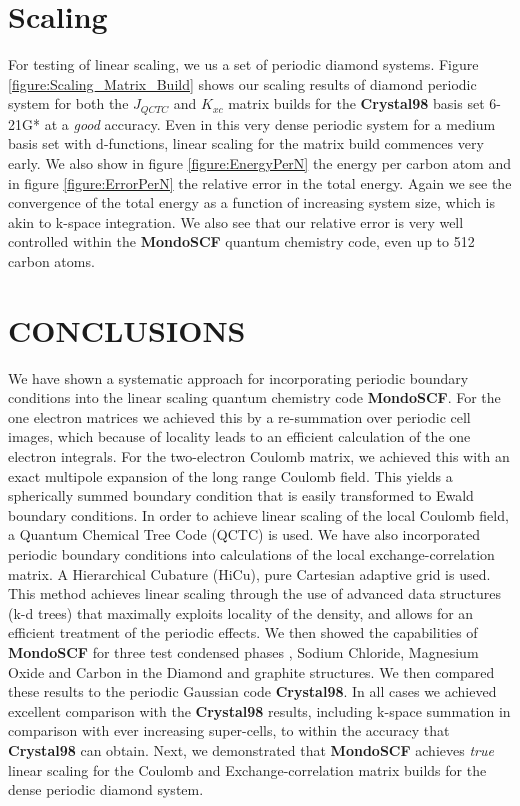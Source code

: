 \documentclass[prb,aps,nobibnotes,twocolumn,doublespace,twocolumngrid,superbib]{revtex4}
\begin{document}
\section{Scaling}

For testing of linear scaling, we us a set of periodic diamond systems.
Figure \ref{figure:Scaling_Matrix_Build} shows our scaling results
of diamond periodic system for both the \( J_{QCTC} \) and \( K_{xc} \)
matrix builds for the \textbf{Crystal98} basis set 6-21G* \cite{C98Basis}
at a {\it good} accuracy. Even in this very dense periodic system for a medium 
basis set with d-functions, linear scaling for the matrix build commences very 
early. We also show in figure \ref{figure:EnergyPerN} the energy per carbon atom and 
in figure \ref{figure:ErrorPerN} the relative error in the total energy. 
Again we see the convergence of the total energy
as a function of increasing system size, which is akin to k-space integration. We also
see that our relative error is very well controlled within the \textbf{MondoSCF} quantum
chemistry code, even up to 512 carbon atoms.


\section{CONCLUSIONS}

We have shown a systematic approach for incorporating periodic boundary conditions
into the linear scaling quantum chemistry code {\bf MondoSCF}.
For the one electron matrices we achieved this by a re-summation
over periodic cell images, which because of locality leads to an efficient
calculation of the one electron integrals. 
For the two-electron Coulomb
matrix, we achieved this with an exact multipole expansion of
the long range Coulomb field. 
This yields a spherically summed boundary
condition that is easily transformed to Ewald boundary conditions.
In order to achieve linear scaling of the local Coulomb field, a Quantum
Chemical Tree Code (QCTC) is used. 
We have also incorporated periodic
boundary conditions into calculations of the local exchange-correlation
matrix. 
A Hierarchical Cubature (HiCu), pure Cartesian adaptive grid
is used. 
This method achieves linear scaling through the use of advanced
data structures (k-d trees) that maximally exploits locality of the
density, and allows for an efficient treatment of the periodic effects.
%
We then showed the capabilities of \textbf{MondoSCF} for three test condensed
phases , Sodium Chloride, Magnesium Oxide and Carbon in the Diamond
and graphite structures. We then compared these results to the periodic
Gaussian code \textbf{Crystal98}. 
In all cases we achieved excellent comparison with the  \textbf{Crystal98}
results, including k-space summation in comparison with ever 
increasing super-cells, to within the accuracy that \textbf{Crystal98} can obtain.
%
Next, we demonstrated that \textbf{MondoSCF} achieves {\it true} linear scaling
for the Coulomb and Exchange-correlation matrix builds for
the dense periodic diamond system.
%
\end{document}
